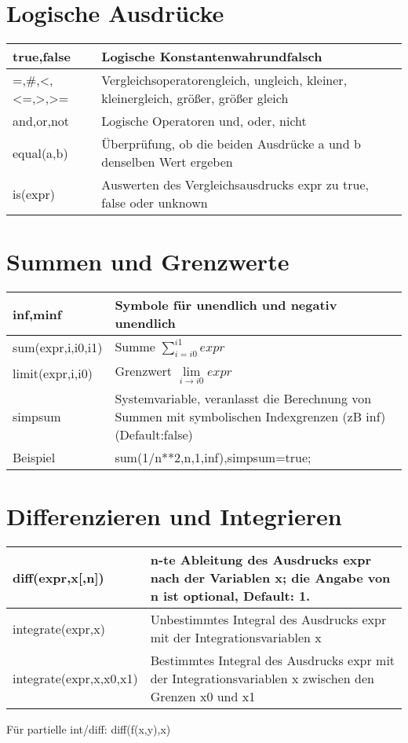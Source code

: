 \documentclass[../main.tex]{subfiles}
\begin{document}
\section{Logische Ausdrücke}
\begin{tabularx}{1.0\textwidth} { 
    >{\centering\arraybackslash}X 
    >{\centering\arraybackslash}X  }
    true,false & Logische Konstantenwahrundfalsch
    \\ [7pt]
    \hline
    =,\#,<,<=,>,>= & Vergleichsoperatorengleich, ungleich, kleiner, kleinergleich, größer, größer gleich
    \\ [7pt]
    \hline
    and,or,not & Logische Operatoren und, oder, nicht
    \\ [7pt]
    \hline
    equal(a,b) & Überprüfung, ob die beiden Ausdrücke a und b denselben Wert ergeben
    \\ [7pt]
    \hline
    is(expr) & Auswerten des Vergleichsausdrucks expr zu true, false oder unknown
    \\ [7pt]
    \hline
\end{tabularx}

\section{Summen und Grenzwerte}
\begin{tabularx}{1.0\textwidth} { 
    >{\centering\arraybackslash}X 
    >{\centering\arraybackslash}X  }
    inf,minf & Symbole für unendlich und negativ unendlich
    \\ [7pt]
    \hline
    sum(expr,i,i0,i1) & Summe $\sum\limits_{i=i0}^{i1}expr$
    \\ [7pt]
    \hline
    limit(expr,i,i0) & Grenzwert $\lim\limits_{i\to i0}expr$
    \\ [7pt]
    \hline
    simpsum & Systemvariable, veranlasst die Berechnung von Summen mit symbolischen Indexgrenzen (zB inf) (Default:false)
    \\ [7pt]
    \hline
    Beispiel & sum(1/n**2,n,1,inf),simpsum=true;
    \\ [7pt]
    \hline
\end{tabularx}


\section{Differenzieren und Integrieren}
\begin{tabularx}{1.0\textwidth} { 
    >{\centering\arraybackslash}X 
    >{\centering\arraybackslash}X  }
    diff(expr,x[,n]) & n-te Ableitung des Ausdrucks expr nach der Variablen x; die Angabe von n ist optional, Default: 1.
    \\ [7pt]
    \hline
    integrate(expr,x) & Unbestimmtes Integral des Ausdrucks expr mit der Integrationsvariablen x
    \\ [7pt]
    \hline
    integrate(expr,x,x0,x1) & Bestimmtes Integral des Ausdrucks expr mit der Integrationsvariablen x zwischen den Grenzen x0 und x1
    \\ [20pt]
\end{tabularx}
Für partielle int/diff: diff(f(x,y),x)
\end{document}
